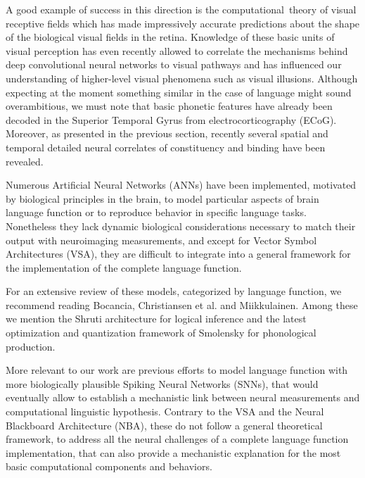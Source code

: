 \documentclass[10pt]{article}
\begin{document}
A good example of success in this direction is the computational~theory of visual receptive fields\cite{lindeberg2017normative} which has made impressively accurate predictions 
about the shape of the biological visual fields in the retina.
Knowledge of these basic units of visual perception has even recently allowed to correlate the mechanisms behind deep convolutional neural networks to visual 
pathways\cite{Guclu_2015,Eickenberg_2017} and has influenced our understanding of higher-level visual phenomena such as visual illusions\cite{Eagleman_2001}.
Although expecting at the moment something similar in the case of language might sound overambitious, we must note that basic phonetic features have already been decoded in the 
Superior Temporal Gyrus from electrocorticography (ECoG)\cite{Mesgarani_2014}.
Moreover, as presented in the previous section, recently several spatial and temporal detailed neural correlates of constituency and binding have been revealed.

Numerous Artificial Neural Networks (ANNs) have been implemented, motivated by biological principles in the brain, to model particular aspects of brain language function or to reproduce behavior in specific language tasks.
Nonetheless they lack dynamic biological considerations necessary to match their output with neuroimaging measurements, and except for Vector Symbol Architectures (VSA)\cite{smolensky2006harmonic}, they are difficult to integrate into a general framework for the implementation of the complete language function.

For an extensive review of these models, categorized by language function, we recommend reading Bocancia\cite{bocancia2014psycholinguistically}, 
Christiansen et al.\cite{Christiansen_1999} and Miikkulainen\cite{miikkulainen1997natural}.
Among these we mention the Shruti architecture for logical inference\cite{Wendelken_2004} and the latest optimization and quantization framework of Smolensky for phonological 
production\cite{Smolensky_2013}.

More relevant to our work are previous efforts to model language function with more biologically plausible Spiking Neural Networks (SNNs), 
that would eventually allow to establish a mechanistic link between neural measurements and computational linguistic hypothesis.
Contrary to the VSA and the Neural Blackboard Architecture (NBA)\cite{van_der_Velde_2006}, these do not follow a general theoretical framework, to address all the neural challenges of a complete language function implementation, that can also provide a mechanistic explanation for the most basic computational components and behaviors.
\end{document}
